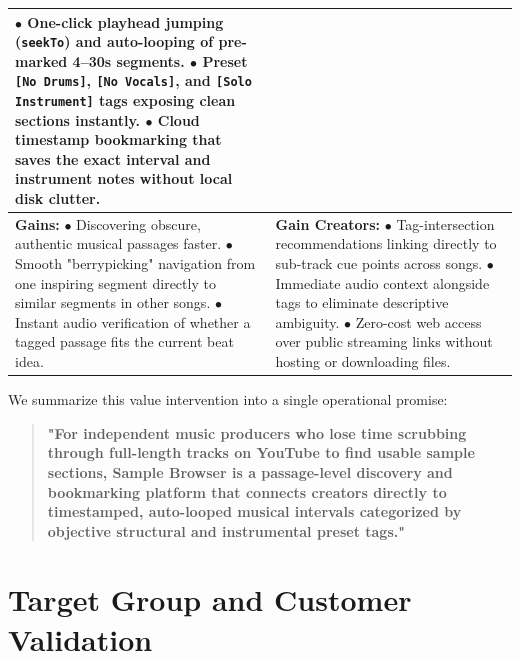 \begin{table}[htbp]
\begin{tabularx}{\textwidth}{|>{\raggedright\arraybackslash}X|>{\raggedright\arraybackslash}X|}
        $\bullet$ One-click playhead jumping (\texttt{seekTo}) and auto-looping of pre-marked 4--30s segments. \newline 
        $\bullet$ Preset \texttt{[No Drums]}, \texttt{[No Vocals]}, and \texttt{[Solo Instrument]} tags exposing clean sections instantly. \newline 
        $\bullet$ Cloud timestamp bookmarking that saves the exact interval and instrument notes without local disk clutter. \\
        \hline
        \textbf{Gains:} \newline 
        $\bullet$ Discovering obscure, authentic musical passages faster. \newline 
        $\bullet$ Smooth "berrypicking" navigation from one inspiring segment directly to similar segments in other songs. \newline 
        $\bullet$ Instant audio verification of whether a tagged passage fits the current beat idea. & 
        \textbf{Gain Creators:} \newline 
        $\bullet$ Tag-intersection recommendations linking directly to sub-track cue points across songs. \newline 
        $\bullet$ Immediate audio context alongside tags to eliminate descriptive ambiguity. \newline 
        $\bullet$ Zero-cost web access over public streaming links without hosting or downloading files. \\
        \hline
    \end{tabularx}
    \label{tbl:vpc}
\end{table}

We summarize this value intervention into a single operational promise:
\begin{quote}
\textbf{"For independent music producers who lose time scrubbing through full-length tracks on YouTube to find usable sample sections, Sample Browser is a passage-level discovery and bookmarking platform that connects creators directly to timestamped, auto-looped musical intervals categorized by objective structural and instrumental preset tags."}
\end{quote}

\section{Target Group and Customer Validation}

